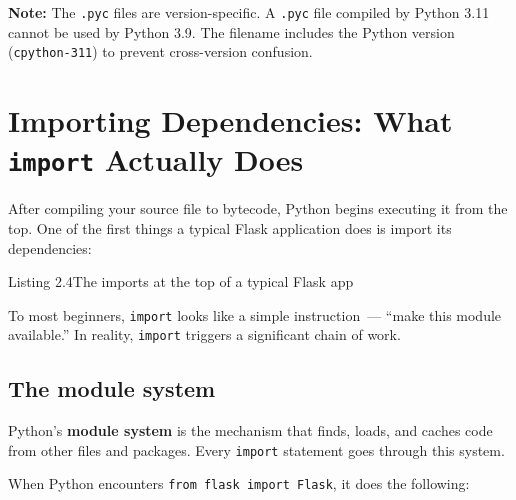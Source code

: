 \begin{notebox}

\textbf{Note:} The \texttt{.pyc} files are version-specific. A \texttt{.pyc} file compiled by Python 3.11 cannot be used by Python 3.9. The filename includes the Python version (\texttt{cpython-311}) to prevent cross-version confusion.

\end{notebox}

\setcounter{section}{3}
\section{\texorpdfstring{Importing Dependencies: What \texttt{import} Actually Does}{Importing Dependencies: What import Actually Does}}\label{02-runtime-initialization:24-importing-dependencies-what-import-actually-does}

After compiling your source file to bytecode, Python begins executing it from the top. One of the first things a typical Flask application does is import its dependencies:

\begin{codeboxcap}[short]{\textcolor{accent}{Listing 2.4}\enspace The imports at the top of a typical Flask app}

\begin{Shaded}
\begin{Highlighting}[]
\end{Highlighting}
\end{Shaded}

\end{codeboxcap}

\noindent{}To most beginners, \texttt{import} looks like a simple instruction~--- ``make this module available.'' In reality, \texttt{import} triggers a significant chain of work.

\subsection*{The module system}\label{02-runtime-initialization:the-module-system}

Python's \textbf{module system} is the mechanism that finds, loads, and caches code from other files and packages. Every \texttt{import} statement goes through this system.

When Python encounters \texttt{from\ flask\ import\ Flask}, it does the following:

